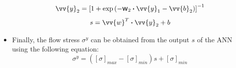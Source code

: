 \documentclass[twoside,english,1p,final,sort&compress]{elsarticle}
\theoremstyle{plain}
\DeclareRobustCommand{\w}{\mbox{\large\ensuremath{\mathsf{w}}}}
\DeclareRobustCommand{\dotp}{\boldsymbol{\cdot}}
\renewcommand{\overrightarrow}{\vv}
\begin{document}
\begin{itemize}
\begin{equation}
\end{equation}
\begin{equation}
\overrightarrow{y}_2 = \left[1 + \exp{\left(- \w_2 \dotp \overrightarrow{y}_1- \overrightarrow{b}_2\right)}\right]^{-1}
\end{equation}
\begin{equation}
s = \overrightarrow{w}^T \dotp \overrightarrow{y}_2 + b
\end{equation}
\item Finally, the flow stress $\sigma^y$ can be obtained from the output $s$ of the ANN using the following equation:
\begin{equation}
\sigma^y =  \left([\sigma]_{max}-[\sigma]_{min}\right)s + [\sigma]_{min} \label{eq:CR2}
\end{equation}
\end{itemize}
\end{document}
